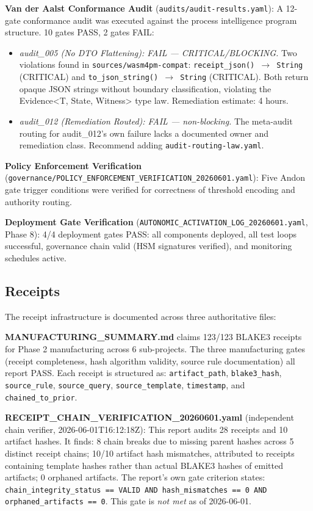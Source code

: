 \textbf{Van der Aalst Conformance Audit} (\texttt{audits/audit-results.yaml}): A 12-gate conformance audit was executed against the process intelligence program structure. 10 gates PASS, 2 gates FAIL:
\begin{itemize}
  \item \textit{audit\_005 (No DTO Flattening): FAIL --- CRITICAL/BLOCKING.} Two violations found in \texttt{sources/wasm4pm-compat}: \texttt{receipt\_json() $\to$ String} (CRITICAL) and \texttt{to\_json\_string() $\to$ String} (CRITICAL). Both return opaque JSON strings without boundary classification, violating the Evidence<T, State, Witness> type law. Remediation estimate: 4 hours.
  \item \textit{audit\_012 (Remediation Routed): FAIL --- non-blocking.} The meta-audit routing for audit\_012's own failure lacks a documented owner and remediation class. Recommend adding \texttt{audit-routing-law.yaml}.
\end{itemize}

\textbf{Policy Enforcement Verification} (\texttt{governance/POLICY\_ENFORCEMENT\_VERIFICATION\_20260601.yaml}): Five Andon gate trigger conditions were verified for correctness of threshold encoding and authority routing.

\textbf{Deployment Gate Verification} (\texttt{AUTONOMIC\_ACTIVATION\_LOG\_20260601.yaml}, Phase 8): 4/4 deployment gates PASS: all components deployed, all test loops successful, governance chain valid (HSM signatures verified), and monitoring schedules active.

\subsection{Receipts}
\label{sec:research-pi-program-evidence-receipts}

The receipt infrastructure is documented across three authoritative files:

\textbf{MANUFACTURING\_SUMMARY.md} claims 123/123 BLAKE3 receipts for Phase 2 manufacturing across 6 sub-projects. The three manufacturing gates (receipt completeness, hash algorithm validity, source rule documentation) all report PASS. Each receipt is structured as: \texttt{artifact\_path}, \texttt{blake3\_hash}, \texttt{source\_rule}, \texttt{source\_query}, \texttt{source\_template}, \texttt{timestamp}, and \texttt{chained\_to\_prior}.

\textbf{RECEIPT\_CHAIN\_VERIFICATION\_20260601.yaml} (independent chain verifier, 2026-06-01T16:12:18Z): This report audits 28 receipts and 10 artifact hashes. It finds: 8 chain breaks due to missing parent hashes across 5 distinct receipt chains; 10/10 artifact hash mismatches, attributed to receipts containing template hashes rather than actual BLAKE3 hashes of emitted artifacts; 0 orphaned artifacts. The report's own gate criterion states: \texttt{chain\_integrity\_status == VALID AND hash\_mismatches == 0 AND orphaned\_artifacts == 0}. This gate is \textit{not met} as of 2026-06-01.

